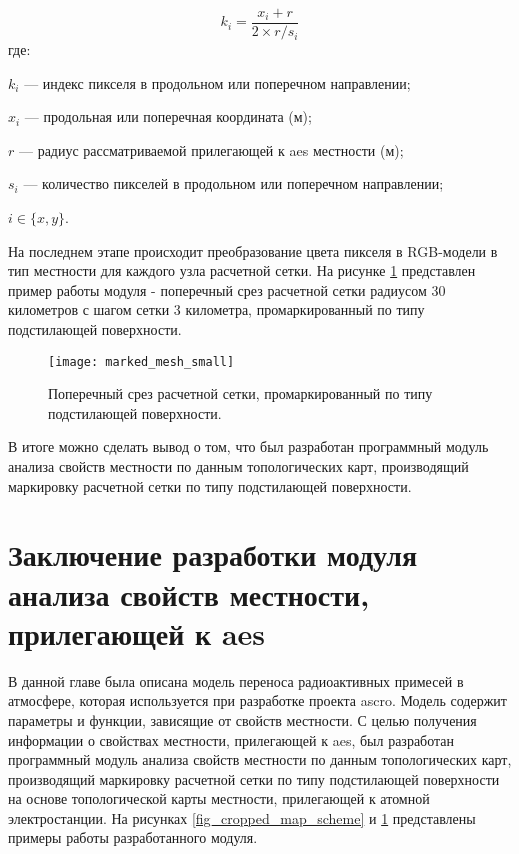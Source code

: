 \begin{equation}
    \label{eq_pix_to_coords}
    k_i = \frac{x_i+r}{2 \times r / s_i}    
\end{equation}
где:
\begin{description}
    \item $k_i$ --- индекс пикселя в продольном или поперечном направлении;
    \item $x_i$ --- продольная или поперечная координата (м);
    \item $r$ --- радиус рассматриваемой прилегающей к \ac{aes} местности (м);
    \item $s_i$ --- количество пикселей в продольном или поперечном направлении;
    \item $i \in \{x, y\}$.
\end{description}

На последнем этапе происходит преобразование цвета пикселя в RGB-модели в тип местности для каждого узла расчетной сетки. 
На рисунке \ref{fig_marked_mesh} представлен пример работы модуля - поперечный срез расчетной сетки радиусом 30 
километров с шагом сетки 3 километра, промаркированный по типу подстилающей поверхности.

\begin{figure}[ht]
\centering
    \texttt{[image: marked\_mesh\_small]}
    \captionsetup{justification=centering}
    \caption{Поперечный срез расчетной сетки, промаркированный по типу подстилающей поверхности.}
    \label{fig_marked_mesh}
\end{figure}

В итоге можно сделать вывод о том, что был разработан программный модуль анализа свойств местности по данным 
топологических карт, производящий маркировку расчетной сетки по типу подстилающей поверхности.

\section{Заключение разработки модуля анализа свойств местности, прилегающей к \ac{aes}}

В данной главе была описана модель переноса радиоактивных примесей в атмосфере, которая используется при разработке 
проекта \ac{ascro}. Модель содержит параметры и функции, зависящие от свойств местности. С целью получения информации о 
свойствах местности, прилегающей к \ac{aes}, был разработан программный модуль анализа свойств местности по данным 
топологических карт, производящий маркировку расчетной сетки по типу подстилающей поверхности на основе топологической 
карты местности, прилегающей к атомной электростанции. На рисунках \ref{fig_cropped_map_scheme} и \ref{fig_marked_mesh} 
представлены примеры работы разработанного модуля.
